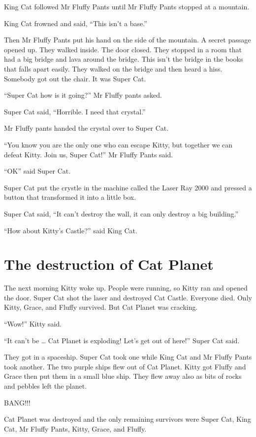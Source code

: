 \documentclass[12pt,oneside]{krantz}
\begin{document}
King Cat followed Mr Fluffy Pants until Mr Fluffy Pants stopped at a
mountain.

King Cat frowned and said, ``This isn't a base.''

Then Mr Fluffy Pants put his hand on the side of the mountain. A secret
passage opened up. They walked inside. The door closed. They stopped in
a room that had a big bridge and lava around the bridge. This isn't the
bridge in the books that falls apart easily. They walked on the bridge
and then heard a hiss. Somebody got out the chair. It was Super Cat.

``Super Cat how is it going?'' Mr Fluffy pants asked.

Super Cat said, ``Horrible. I need that crystal.''

Mr Fluffy pants handed the crystal over to Super Cat.

``You know you are the only one who can escape Kitty, but together we
can defeat Kitty. Join us, Super Cat!'' Mr Fluffy Pants said.

``OK'' said Super Cat.

Super Cat put the crystle in the machine called the Laser Ray 2000 and
pressed a button that transformed it into a little box.

Super Cat said, ``It can't destroy the wall, it can only destroy a big
building.''

``How about Kitty's Castle?'' said King Cat.

\hypertarget{the-destruction-of-cat-planet}{%
\chapter{The destruction of Cat
Planet}\label{the-destruction-of-cat-planet}}

The next morning Kitty woke up. People were running, so Kitty ran and
opened the door. Super Cat shot the laser and destroyed Cat Castle.
Everyone died. Only Kitty, Grace, and Fluffy survived. But Cat Planet
was cracking.

``Wow!'' Kitty said.

``It can't be \ldots{} Cat Planet is exploding! Let's get out of here!''
Super Cat said.

They got in a spaceship. Super Cat took one while King Cat and Mr Fluffy
Pants took another. The two purple ships flew out of Cat Planet. Kitty
got Fluffy and Grace then put them in a small blue ship. They flew away
also as bits of rocks and pebbles left the planet.

BANG!!!

Cat Planet was destroyed and the only remaining survivors were Super
Cat, King Cat, Mr Fluffy Pants, Kitty, Grace, and Fluffy.
\end{document}
